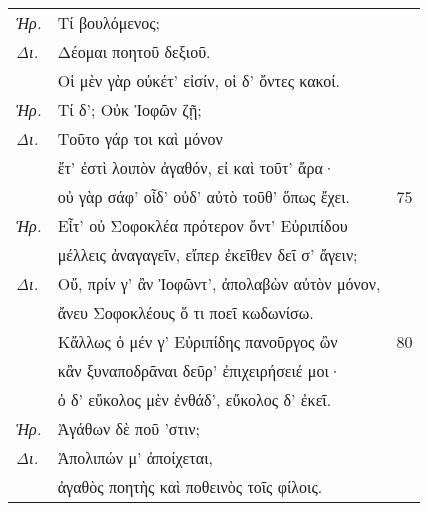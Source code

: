 \documentclass[13pt]{article}
\begin{document}
\begin{greek}
\begin{multicols}{2}
\begin{parcolumns}[colwidths={1=1.5em, 2=0.9\linewidth}]{2}
\end{parcolumns}
\end{multicols}

\newpage

\begin{spacing}{1.5}

\begin{tabularx}{\textwidth}{@{}lXr@{}}
  \textit{Ἡρ.} & Τί βουλόμενος; & \\
  \textit{Δι.} & \hspace*{6.5em}Δέομαι ποητοῦ δεξιοῦ. & \\
  & Οἱ μὲν γὰρ οὐκέτ' εἰσίν, οἱ δ' ὄντες κακοί. & \\
  \textit{Ἡρ.} & Τί δ'; Οὐκ Ἰοφῶν ζῇ; & \\
  \textit{Δι.} & \hspace*{8.5em}Τοῦτο γάρ τοι καὶ μόνον & \\
  & ἔτ' ἐστὶ λοιπὸν ἀγαθόν, εἰ καὶ τοῦτ' ἄρα· & \\
  & οὐ γὰρ σάφ' οἶδ' οὐδ' αὐτὸ τοῦθ' ὅπως ἔχει. & 75 \\
  \textit{Ἡρ.} & Εἶτ' οὐ Σοφοκλέα πρότερον ὄντ' Εὐριπίδου & \\
  & μέλλεις ἀναγαγεῖν, εἴπερ ἐκεῖθεν δεῖ σ' ἄγειν; & \\
  \textit{Δι.} & Οὔ, πρίν γ' ἂν Ἰοφῶντ', ἀπολαβὼν αὐτὸν μόνον, & \\
  & ἄνευ Σοφοκλέους ὅ τι ποεῖ κωδωνίσω. & \\
  & Κἄλλως ὁ μέν γ' Εὐριπίδης πανοῦργος ὢν & 80 \\
  & κἂν ξυναποδρᾶναι δεῦρ' ἐπιχειρήσειέ μοι· & \\
  & ὁ δ' εὔκολος μὲν ἐνθάδ', εὔκολος δ' ἐκεῖ. & \\
  \textit{Ἡρ.} & Ἀγάθων δὲ ποῦ 'στιν; & \\
  \textit{Δι.} & \hspace*{9em}Ἀπολιπών μ' ἀποίχεται, & \\
  & ἀγαθὸς ποητὴς καὶ ποθεινὸς τοῖς φίλοις. & \\
\end{tabularx}

\end{spacing}

\newpage


\end{greek}
\end{document}
